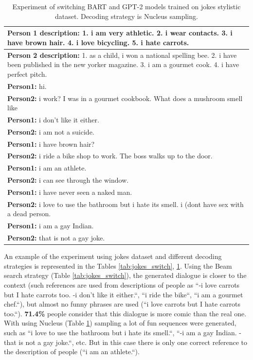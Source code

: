 \begin{table}[H]
\centering
 \begin{tabular}{|p{14cm}|} 
 \hline
 \textbf{Person 1 description:} 1. i am very athletic. 2. i wear contacts. 3. i have brown hair. 4. i love bicycling. 5. i hate carrots. \\
 \hline
 \textbf{Person 2 description:} 1. as a child, i won a national spelling bee. 2. i have been published in the new yorker magazine. 3. i am a gourmet cook. 4. i have perfect pitch. \\
 \hline
 \textbf{Person1:} hi.  \\
 \textbf{Person2:} i work? I was in a gourmet cookbook. What does a mushroom smell like \\ 
 \textbf{Person1:} i don't like it either. \\
 \textbf{Person2:} i am not a suicide.\\
 \textbf{Person1:} i have brown hair?  \\
 \textbf{Person2:} i ride a bike shop to work. The boss walks up to the door. \\
 \textbf{Person1:} i am an athlete. \\
 \textbf{Person2:} i can see through the window. \\
 \textbf{Person1:} i have never seen a naked man. \\
 \textbf{Person2:} i love to use the bathroom but i hate its smell. i (dont have sex with a dead person. \\
 \textbf{Person1:} i am a gay Indian. \\
 \textbf{Person2:} that is not a gay joke. \\
 \hline
 \end{tabular}
 \caption{Experiment of switching BART and GPT-2 models trained on jokes stylistic dataset. Decoding strategy is Nucleus sampling.}
\label{tab:jokes_switch_nucleus}
\end{table}

An example of the experiment using jokes dataset and different decoding strategies is represented in the Tables \ref{tab:jokes_switch}, \ref{tab:jokes_switch_nucleus}. Using the Beam search strategy (Table \ref{tab:jokes_switch}), the generated dialogue is closer to the context (such references are used from descriptions of people as ``-i love carrots but I hate carrots too. -i don't like it either.``, ``i ride the bike``, ``i am a gourmet chef.``), but almost no funny phrases are used (``i love carrots but I hate carrots too.``). \textbf{71.4\%} people consider that this dialogue is more comic than the real one. With using Nucleus (Table \ref{tab:jokes_switch_nucleus}) sampling a lot of fun sequences were generated, such as ``i love to use the bathroom but i hate its smell.``, ``-i am a gay Indian. -that is not a gay joke.``, etc. But in this case there is only one correct reference to the description of people (``i am an athlete.``).


